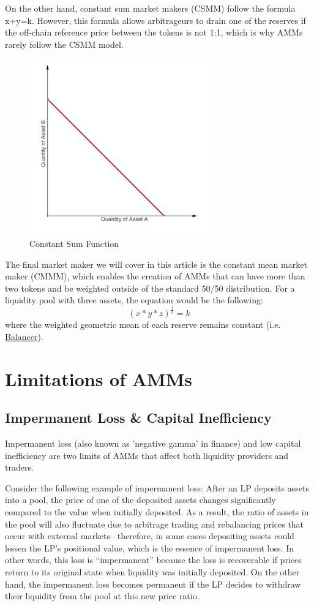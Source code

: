 \documentclass[12pt]{article}
\begin{document}
On the other hand, constant sum market makers (CSMM) follow the formula x+y=k. However, this formula allows arbitrageurs to drain one of the reserves if the off-chain reference price between the tokens is not 1:1, which is why AMMs rarely follow the CSMM model. 
\begin{figure}[H]
    \centering
    \includegraphics[width=0.5\linewidth]{constant_sum.png}
    \caption{Constant Sum Function}
    \label{fig:constant_sum}
\end{figure}

The final market maker we will cover in this article is the constant mean market maker (CMMM), which enables the creation of AMMs that can have more than two tokens and be weighted outside of the standard 50/50 distribution. For a liquidity pool with three assets, the equation would be the following:
\[
(x*y*z)^{\frac{1}{3}}=k
\]
where the weighted geometric mean of each reserve remains constant (i.e. \href{https://balancer.fi/}{Balancer}).

\section{Limitations of AMMs}
\subsection{Impermanent Loss \& Capital Inefficiency}
Impermanent loss (also known as 'negative gamma' in finance) and low capital inefficiency are two limits of AMMs that affect both liquidity providers and traders.

Consider the following example of impermanent loss: After an LP deposits assets into a pool, the price of one of the deposited assets changes significantly compared to the value when initially deposited. As a result, the ratio of assets in the pool will also fluctuate due to arbitrage trading and rebalancing prices that occur with external markets– therefore, in some cases depositing assets could lessen the LP’s positional value, which is the essence of impermanent loss. In other words, this loss is “impermanent” because the loss is recoverable if prices return to its original state when liquidity was initially deposited. On the other hand, the impermanent loss becomes permanent if the LP decides to withdraw their liquidity from the pool at this new price ratio.
\end{document}
